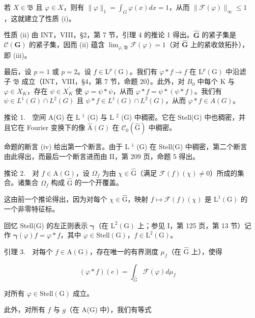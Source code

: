 若 \(X \in \mathfrak{B}\) 且 \(\varphi \in X\)，则有 \(\| \varphi \|_1 = \int_{G} \varphi(x) dx = 1\)，从而 \(\| \mathcal{F}(\varphi) \|_\infty \leqslant 1\)，这就建立了性质 (i)。

性质 (ii) 由 INT，VIII，§2，第 7 节，引理 4 的推论 1 得出。\(\widehat{\mathbf{G}}\) 的紧子集是 \(\mathcal{C}(\mathbf{G})\) 的紧子集，因而 (ii) 蕴含 \(\lim_{\varphi, \mathfrak{B}} \mathcal{F}(\varphi) = 1\)（对 \(\widehat{\mathbf{G}}\) 上的紧收敛拓扑），即 (iii)。

最后，设 \(p=1\) 或 \(p=2\)。设 \(f\in\mathrm{L}^{p}(\mathrm{G})\)。我们有 \(\varphi*f\to f\) 在 \(\mathrm{L}^{p}(\mathrm{G})\) 中沿滤子 \(\mathfrak{B}\) 成立（INT，VIII，§4，第 7 节，命题 20）。此外，对 \(B_{0}\) 中每个 K 与 \(\varphi\in X_{K}\)，存在 \(\psi\in X_{K}^{\prime}\) 使 \(\varphi=\psi*\psi\)，从而 \(\varphi*f=\psi*(\psi*f)\)。我们有 \(\psi\in L^{1}(G)\cap L^{2}(G)\) 且 \(\psi*f\in L^{1}(G)\cap L^{2}(G)\)，从而 \(\varphi*f\in A(G)\)。

推论 1.　空间 A(G) 在 L \(^{1}\) (G) 与 L \(^{2}\) (G) 中稠密。它在 Stell(G) 中也稠密，并且它在 Fourier 变换下的像 \(\widehat{\mathrm{A}}(G)\) 在 \(\mathcal{C}_{0}(\widehat{\mathrm{G}})\) 中稠密。

命题的断言 (iv) 给出第一个断言。由于 L \(^{1}\) (G) 在 Stell(G) 中稠密，第二个断言由此得出，而最后一个断言进而由 II，第 209 页，命题 5 得出。

推论 2.　对 \(f \in \mathrm{A}(\mathrm{G})\)，设 \(\Omega_f\) 为由 \(\chi \in \widehat{\mathrm{G}}\)（满足 \(\mathcal{F}(f)(\chi) \neq 0\)）所成的集合。诸集合 \(\Omega_f\) 构成 \(\widehat{\mathrm{G}}\) 的一个开覆盖。

这由前一个推论得出，因为对每个 \(\chi \in \widehat{\mathrm{G}}\)，映射 \(f \mapsto \mathcal{F}(f)(\chi)\) 是 \(\mathrm{L}^1(\mathrm{G})\) 的一个非零特征标。

回忆 Stell(G) 的左正则表示 \(\pmb{\gamma}\)（在 \(\mathrm{L}^2 (\mathrm{G})\) 上；参见 I，第 125 页，第 13 节）记作 \(\pmb{\gamma}(\varphi)f = \varphi *f\)，其中 \(\varphi \in \mathrm{Stell}(\mathrm{G})\)，\(f\in \mathrm{L}^2 (\mathrm{G})\)。

引理 3.　对每个 \(f \in \mathrm{A}(\mathrm{G})\)，存在唯一的有界测度 \(\mu_{f}\)（在 \(\widehat{\mathrm{G}}\) 上），使得

\[
(\varphi * f) (e) = \int_ {\widehat {G}} \mathcal {F} (\varphi) d \mu_ {f}\tag{17}
\]

对所有 \(\varphi\in\mathrm{Stell}(\mathrm{G})\) 成立。

此外，对所有 \(f\) 与 \(g\)（在 A(G) 中），我们有等式

